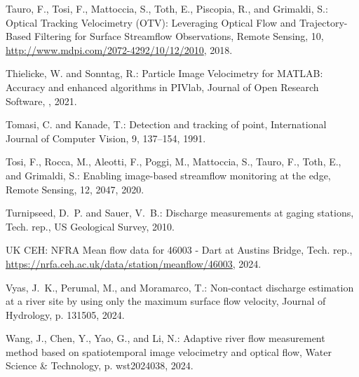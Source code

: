 \documentclass[hess, manuscript]{copernicus} %
\begin{document}
\begin{thebibliography}{68}
Tauro, F., Tosi, F., Mattoccia, S., Toth, E., Piscopia, R., and Grimaldi, S.:
  Optical Tracking Velocimetry (OTV): Leveraging Optical Flow and
  Trajectory-Based Filtering for Surface Streamflow Observations, Remote
  Sensing, 10, \urlprefix\url{http://www.mdpi.com/2072-4292/10/12/2010},
  2018{}.

Thielicke, W. and Sonntag, R.: Particle Image Velocimetry for MATLAB: Accuracy
  and enhanced algorithms in PIVlab, Journal of Open Research Software,
  , 2021.

Tomasi, C. and Kanade, T.: Detection and tracking of point, International
  Journal of Computer Vision, 9, 137--154, 1991.

Tosi, F., Rocca, M., Aleotti, F., Poggi, M., Mattoccia, S., Tauro, F., Toth,
  E., and Grimaldi, S.: Enabling image-based streamflow monitoring at the edge,
  Remote Sensing, 12, 2047, 2020.

Turnipseed, D.~P. and Sauer, V.~B.: Discharge measurements at gaging stations,
  Tech. rep., US Geological Survey, 2010.

{UK CEH}: NFRA Mean flow data for 46003 - Dart at Austins Bridge, Tech. rep.,
  \urlprefix\url{https://nrfa.ceh.ac.uk/data/station/meanflow/46003}, 2024.

Vyas, J.~K., Perumal, M., and Moramarco, T.: Non-contact discharge estimation
  at a river site by using only the maximum surface flow velocity, Journal of
  Hydrology, p. 131505, 2024.

Wang, J., Chen, Y., Yao, G., and Li, N.: Adaptive river flow measurement method
  based on spatiotemporal image velocimetry and optical flow, Water Science \&
  Technology, p. wst2024038, 2024.

\end{thebibliography}



\end{document}
